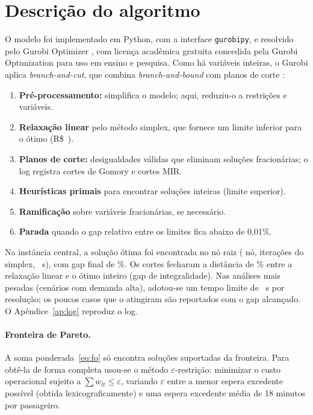 \documentclass[11pt,a4paper]{article}
\begin{document}
\section{Descrição do algoritmo}\label{sec:algoritmo}

O modelo foi implementado em Python, com a interface \texttt{gurobipy}, e
resolvido pelo Gurobi Optimizer \versaoGurobi{} \citep{gurobi2026}, com
licença acadêmica gratuita concedida pela Gurobi Optimization para uso em
ensino e pesquisa. Como há
variáveis inteiras, o Gurobi aplica \emph{branch-and-cut}, que combina
\emph{branch-and-bound} com planos de corte \citep{arenales2007, hillier2013}:
\begin{enumerate}
\item \textbf{Pré-processamento:} simplifica o modelo; aqui, reduziu-o a
\presolveLinhas{} restrições e \presolveColunas{} variáveis.
\item \textbf{Relaxação linear} pelo método simplex, que fornece um limite
inferior para o ótimo (R\$~\Zrelax{}).
\item \textbf{Planos de corte:} desigualdades válidas que eliminam soluções
fracionárias; o log registra \cortesGomory{} cortes de Gomory e \cortesMIR{}
cortes MIR.
\item \textbf{Heurísticas primais} para encontrar soluções inteiras (limite
superior).
\item \textbf{Ramificação} sobre variáveis fracionárias, se necessário.
\item \textbf{Parada} quando o gap relativo entre os limites fica abaixo de
0{,}01\%.
\end{enumerate}
Na instância central, a solução ótima foi encontrada no nó raiz
(\nosExplorados{} nó, \iteracoesSimplex{} iterações do simplex,
\tempoSolucao{}~s), com gap final de \gapFinal\%. Os cortes fecharam a distância
de \gapInt\% entre a relaxação linear e o ótimo inteiro (gap de integralidade).
Nas análises mais pesadas (cenários com demanda alta), adotou-se um tempo limite
de \tempoLimite{}~s por resolução; os poucos casos que o atingiram são
reportados com o gap alcançado. O Apêndice~\ref{ap:log} reproduz o log.

\paragraph{Fronteira de Pareto.}
A soma ponderada~\eqref{eq:fo} só encontra soluções suportadas da fronteira.
Para obtê-la de forma completa usou-se o método $\varepsilon$-restrição: minimizar
o custo operacional sujeito a $\sum w_{lt}\le\varepsilon$, variando $\varepsilon$
entre a menor espera excedente possível (obtida lexicograficamente) e uma espera excedente média de
18 minutos por passageiro.
\end{document}
